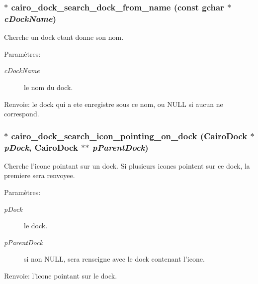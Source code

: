 \subsubsection{$\ast$ cairo\_\-dock\_\-search\_\-dock\_\-from\_\-name (const gchar $\ast$ {\em cDockName})}\label{cairo-dock-dock-manager_8h_fb5a5ccee0196d5332226f4c548594bc}


Cherche un dock etant donne son nom. \begin{Desc}
\item[Paramètres:]
\begin{description}
\item[{\em cDockName}]le nom du dock. \end{description}
\end{Desc}
\begin{Desc}
\item[Renvoie:]le dock qui a ete enregistre sous ce nom, ou NULL si aucun ne correspond. \end{Desc}
\subsubsection{$\ast$ cairo\_\-dock\_\-search\_\-icon\_\-pointing\_\-on\_\-dock ({\bf CairoDock} $\ast$ {\em pDock}, {\bf CairoDock} $\ast$$\ast$ {\em pParentDock})}\label{cairo-dock-dock-manager_8h_0e45ba62e4c156427a36c43d01001797}


Cherche l'icone pointant sur un dock. Si plusieurs icones pointent sur ce dock, la premiere sera renvoyee. \begin{Desc}
\item[Paramètres:]
\begin{description}
\item[{\em pDock}]le dock. \item[{\em pParentDock}]si non NULL, sera renseigne avec le dock contenant l'icone. \end{description}
\end{Desc}
\begin{Desc}
\item[Renvoie:]l'icone pointant sur le dock. \end{Desc}
